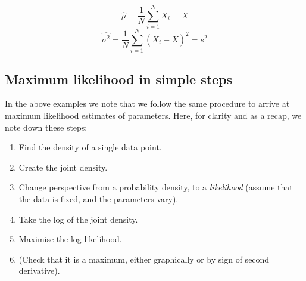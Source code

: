 \documentclass[11pt,fullpage]{book}
\begin{document}
\begin{equation}
\hat{\mu} = \frac{1}{N}\sum\limits_{i=1}^{N} X_i = \bar{X}
\end{equation}
\begin{equation}
\hat{\sigma^2} = \frac{1}{N}\sum\limits_{i=1}^{N}(X_i-\bar{X})^2 = s^2
\end{equation}

\subsection{Maximum likelihood in simple steps}
In the above examples we note that we follow the same procedure to arrive at maximum likelihood estimates of parameters. Here, for clarity and as a recap, we note down these steps:

\begin{enumerate}
\item Find the density of a single data point.
\item Create the joint density.
\item Change perspective from a probability density, to a \textit{likelihood} (assume that the data is fixed, and the parameters vary).
\item Take the log of the joint density.
\item Maximise the log-likelihood.
\item (Check that it is a maximum, either graphically or by sign of second derivative).
\end{enumerate}
\end{document}
